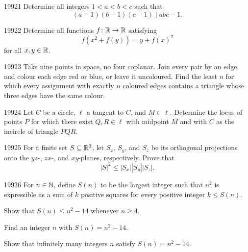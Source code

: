 
\begin{problem}{1992}{1}
Determine all integers $1<a<b<c$ such that
\[
    (a-1)(b-1)(c-1)\mid abc-1.
\]
\end{problem}

\begin{problem}{1992}{2}
Determine all functions $f\colon\mathbb{R}\to\mathbb{R}$ satisfying
\[
    f(x^2+f(y))=y+f(x)^2
\]
for all $x, y\in\mathbb{R}$.
\end{problem}

\begin{problem}{1992}{3}
Take nine points in space, no four coplanar. Join every pair by an edge, and colour each edge red or blue, or leave it uncoloured. Find the least $n$ for which every assignment with exactly $n$ coloured edges contains a triangle whose three edges have the same colour.
\end{problem}

\begin{problem}{1992}{4}
Let $C$ be a circle, $\ell$ a tangent to $C$, and $M\in\ell$. Determine the locus of points $P$ for which there exist $Q, R\in\ell$ with midpoint $M$ and with $C$ as the incircle of triangle $PQR$.
\end{problem}

\begin{problem}{1992}{5}
For a finite set $S\subseteq\mathbb{R}^3$, let $S_x$, $S_y$, and $S_z$ be its orthogonal projections onto the $yz$-, $zx$-, and $xy$-planes, respectively. Prove that
\[
    |S|^2\leq|S_x||S_y||S_z|.
\]
\end{problem}

\begin{problem}{1992}{6}
For $n\in\mathbb{N}$, define $S(n)$ to be the largest integer such that $n^2$ is expressible as a sum of $k$ positive squares for every positive integer $k\leq S(n)$.
\begin{problemsubparts}
    \item Show that $S(n)\leq n^2-14$ whenever $n\geq4$.
    \item Find an integer $n$ with $S(n)=n^2-14$.
    \item Show that infinitely many integers $n$ satisfy $S(n)=n^2-14$.
\end{problemsubparts}
\end{problem}
